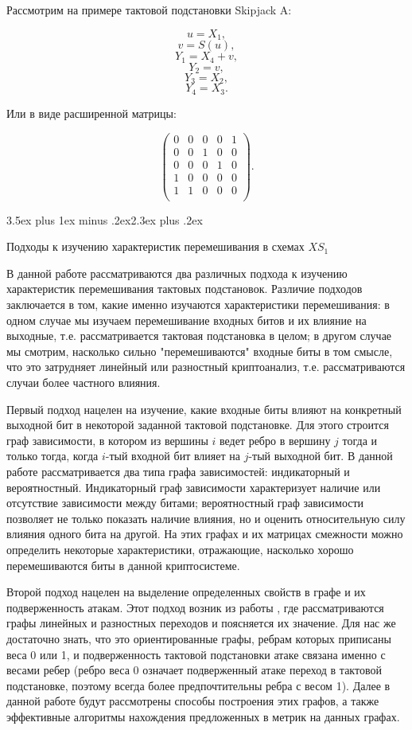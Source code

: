 \documentclass[a4paper,12pt]{report}
\makeatletter
\theoremstyle{plain} %
\theoremstyle{definition}
\theoremstyle{remark}
\renewcommand{\section}{\@startsection{section}{1}{18pt}%
{3.5ex plus 1ex minus .2ex}{2.3ex plus .2ex}%
{\normalfont\Large\bfseries\raggedright}}%
\makeatother
\begin{document}
\begin{large}
Рассмотрим на примере тактовой подстановки Skipjack A:

$$u = X_1,$$
$$v = S(u),$$
$$Y_1 = X_4 + v,$$
$$Y_2 = v,$$
$$Y_3 = X_2,$$
$$Y_4 = X_3.$$

Или в виде расширенной матрицы:

$$
\begin{pmatrix}
0 & 0 & 0 & 0 & 1\\
0 & 0 & 1 & 0 & 0\\
0 & 0 & 0 & 1 & 0\\
1 & 0 & 0 & 0 & 0\\
1    & 1    & 0 & 0    & 0\\
\end{pmatrix}.
$$

\section{Подходы к изучению характеристик перемешивания в схемах $XS_1$}

В данной работе рассматриваются два различных подхода к изучению характеристик перемешивания тактовых подстановок. Различие подходов заключается в том, какие именно изучаются характеристики перемешивания: в одном случае мы изучаем перемешивание входных битов и их влияние на выходные, т.е. рассматривается тактовая подстановка в целом; в другом случае мы смотрим, насколько сильно "перемешиваются" входные биты в том смысле, что это затрудняет линейный или разностный криптоанализ, т.е. рассматриваются случаи более частного влияния.

Первый подход нацелен на изучение, какие входные биты влияют на конкретный выходной бит в некоторой заданной тактовой подстановке. Для этого строится граф зависимости, в котором из вершины $i$ ведет ребро в вершину $j$ тогда и только тогда, когда $i$-тый входной бит влияет на $j$-тый выходной бит. В данной работе рассматривается два типа графа зависимостей: индикаторный и вероятностный. Индикаторный граф зависимости характеризует наличие или отсутствие зависимости между битами; вероятностный граф зависимости позволяет не только показать наличие влияния, но и оценить относительную силу влияния одного бита на другой. На этих графах и их матрицах смежности можно определить некоторые характеристики, отражающие, насколько хорошо перемешиваются биты в данной криптосистеме.

Второй подход нацелен на выделение определенных свойств в графе и их подверженность атакам. Этот подход возник из работы \cite{marchuk}, где рассматриваются графы линейных и разностных переходов и поясняется их значение. Для нас же достаточно знать, что это ориентированные графы, ребрам которых приписаны веса 0 или 1, и подверженность тактовой подстановки атаке связана именно с весами ребер (ребро веса 0 означает подверженный атаке переход в тактовой подстановке, поэтому всегда более предпочтительны ребра с весом 1). Далее в данной работе будут рассмотрены способы построения этих графов, а также эффективные алгоритмы нахождения предложенных в \cite{marchuk} метрик на данных графах.


\end{large}
\end{document}
